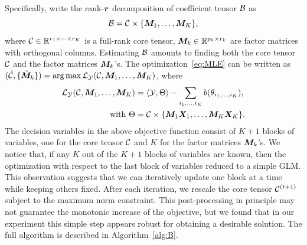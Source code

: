 \documentclass[12pt]{article}
\theoremstyle{plain}
\theoremstyle{definition}
\begin{document}
Specifically, write the rank-$\bm{r}$ decomposition of coefficient tensor $\mathcal{B}$ as
\begin{equation}\label{eq:tucker}
\mathcal{B}=\mathcal{C}\times \{\bm M_1,\ldots,\bm M_K\},
\end{equation}
where $\mathcal{C}\in\mathbb{R}^{r_1\times\cdots\times r_K}$ is a full-rank core tensor, $\bm M_k\in\mathbb{R}^{p_k\times r_k}$ are factor matrices with orthogonal columns. Estimating $\mathcal{B}$ amounts to finding both the core tensor $\mathcal{C}$ and the factor matrices $\bm M_k$'s. The optimization~\eqref{eq:MLE} can be written as $(\hat {\mathcal{C}}, \{\hat {\bm M}_k\})=\arg\max \mathcal{L}_{\mathcal{Y}}(\mathcal{C}, \bm M_1,\ldots,\bm M_K)$, where
\begin{align}
\mathcal{L}_{\mathcal{Y}}(\mathcal{C}, \bm M_1,\ldots,\bm M_K )&=\langle \mathcal{Y}, \Theta\rangle -\sum_{i_1,\ldots,i_K}b(\theta_{i_1,\ldots,i_K}),\\
\text{with } \Theta&=\mathcal{C}\times\{\bm M_1\bm X_1,\ldots,\bm M_K\bm X_K\}.
\end{align}
The decision variables in the above objective function consist of $K+1$ blocks of variables, one for the core tensor $\mathcal{C}$ and $K$ for the factor matrices $\bm M_k$'s. We notice that, if any $K$ out of the $K+1$ blocks of variables are known, then the optimization with respect to the last block of variables reduced to a simple GLM. This observation suggests that we can iteratively update one block at a time while keeping others fixed. After each iteration, we rescale the core tensor $\mathcal{C}^{(t+1)}$ subject to the maximum norm constraint. This post-processing in principle may not guarantee the monotonic increase of the objective, but we found that in our experiment this simple step appears robust for obtaining a desirable solution. The full algorithm is described in Algorithm~\ref{alg:B}.
\end{document}
